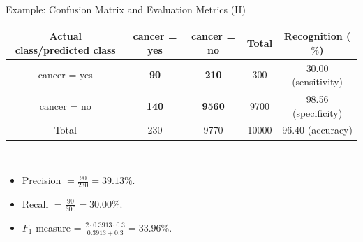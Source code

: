 \begin{frame}{Example: Confusion Matrix and Evaluation Metrics (II)}
	\centering
	\begin{tabular}{|c|c|c|c|c|}
		\hline
		Actual class/predicted class & cancer = yes & cancer = no   & Total & Recognition ($\%$)  \\\hline
		cancer = yes                 & \textbf{90}  & \textbf{210}  & 300   & 30.00 (sensitivity) \\\hline
		cancer = no                  & \textbf{140} & \textbf{9560} & 9700  & 98.56 (specificity) \\\hline
		Total                        & 230          & 9770          & 10000 & 96.40 (accuracy)    \\\hline
	\end{tabular}\\[0.2cm]
	\begin{itemize}
		\item Precision $= \frac{90}{230} = 39.13 \%$.
		\item Recall $=\frac{90}{300} = 30.00 \%$.
		\item $F_1$-measure = $\frac{2 \cdot 0.3913 \cdot 0.3}{0.3913 + 0.3} = 33.96 \%$.
	\end{itemize}
\end{frame}

